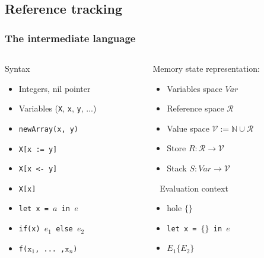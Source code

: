 \documentclass{beamer}
\newcommand{\cl}[1]{\texttt{#1}}
\newcommand{\N}{\mathbb{N}}
\begin{document}
\subsection{Reference tracking}

\begin{frame}
\frametitle{The intermediate language}
\begin{columns}
\begin{column}{0.45\textwidth}
Syntax
\begin{itemize}
\item Integers, nil pointer
\item Variables (\cl{X}, \cl{x}, \cl{y}, ...)
\item \cl{newArray(x, y)}
\item \cl{X[x := y]}
\item \cl{X[x <- y]}
\item \cl{X[x]}
\item \cl{let x = $a$ in $e$}
\item \cl{if(x) $e_1$ else $e_2$}
\item \cl{f($\cl{x}_1$, ... ,$\cl{x}_n$)}
\end{itemize}
\end{column}

\begin{column}{0.55\textwidth}
Memory state representation:
\begin{itemize}
\item Variables space $Var$
\item Reference space $\mathcal{R}$
\item Value space $\mathcal{V} := \N \cup \mathcal{R}$
\item Store $R : \mathcal{R} \longrightarrow \mathcal{V}$
\item Stack $S : Var \longrightarrow \mathcal{V}$
\end{itemize}
\ \newline
Evaluation context
\begin{itemize}
\item hole $\{\}$
\item \cl{let x = $\{\}$ in $e$}
\item $E_1\{E_2\}$
\end{itemize}
\end{column}
\end{columns}

\end{frame}
\end{document}
